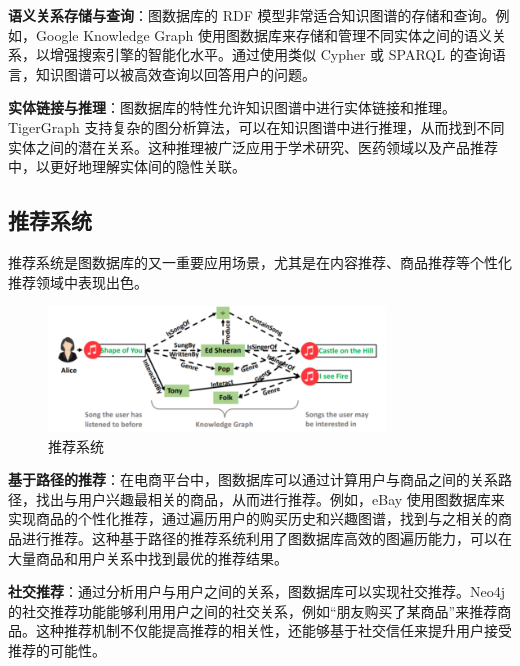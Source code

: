 \textbf{语义关系存储与查询}：图数据库的 RDF 模型非常适合知识图谱的存储和查询。例如，Google Knowledge Graph 使用图数据库来存储和管理不同实体之间的语义关系，以增强搜索引擎的智能化水平。通过使用类似 Cypher 或 SPARQL 的查询语言，知识图谱可以被高效查询以回答用户的问题\cite{dong2014knowledge}。

\textbf{实体链接与推理}：图数据库的特性允许知识图谱中进行实体链接和推理。TigerGraph 支持复杂的图分析算法，可以在知识图谱中进行推理，从而找到不同实体之间的潜在关系。这种推理被广泛应用于学术研究、医药领域以及产品推荐中，以更好地理解实体间的隐性关联\cite{徐增林2016知识图谱技术综述}。


\subsection{推荐系统}
推荐系统是图数据库的又一重要应用场景，尤其是在内容推荐、商品推荐等个性化推荐领域中表现出色\cite{秦川2020基于知识图谱的推荐系统研究综述,刘佳玮2021基于异质信息网络的推荐系统研究综述}。
\begin{figure}
    \centering
    \includegraphics[width=0.8\textwidth]{images/22.png}
    \caption{推荐系统}
    \label{fig:22}
\end{figure}

\textbf{基于路径的推荐}：在电商平台中，图数据库可以通过计算用户与商品之间的关系路径，找出与用户兴趣最相关的商品，从而进行推荐。例如，eBay 使用图数据库来实现商品的个性化推荐，通过遍历用户的购买历史和兴趣图谱，找到与之相关的商品进行推荐。这种基于路径的推荐系统利用了图数据库高效的图遍历能力，可以在大量商品和用户关系中找到最优的推荐结果\cite{fayyaz2020recommendation,wu2022graph,赵俊逸2021协同过滤推荐系统综述}。

\textbf{社交推荐}：通过分析用户与用户之间的关系，图数据库可以实现社交推荐。Neo4j 的社交推荐功能能够利用用户之间的社交关系，例如“朋友购买了某商品”来推荐商品。这种推荐机制不仅能提高推荐的相关性，还能够基于社交信任来提升用户接受推荐的可能性\cite{fayyaz2020recommendation,赵俊逸2021协同过滤推荐系统综述}。


